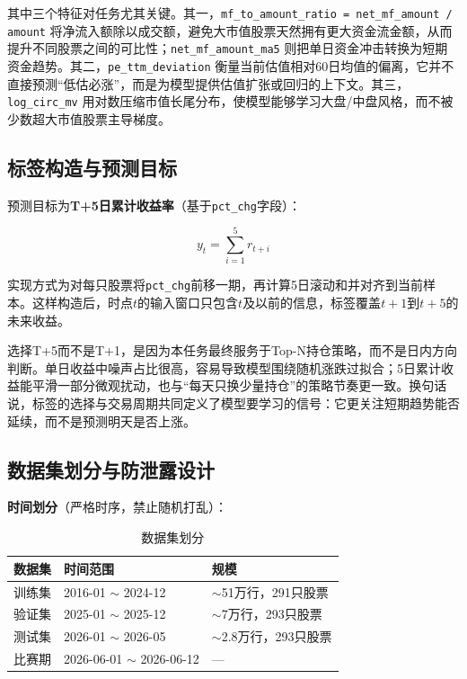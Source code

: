 \documentclass[10pt,a4paper]{ctexart}
\begin{document}
其中三个特征对任务尤其关键。其一，\texttt{mf\_to\_amount\_ratio = net\_mf\_amount / amount} 将净流入额除以成交额，避免大市值股票天然拥有更大资金流金额，从而提升不同股票之间的可比性；\texttt{net\_mf\_amount\_ma5} 则把单日资金冲击转换为短期资金趋势。其二，\texttt{pe\_ttm\_deviation} 衡量当前估值相对60日均值的偏离，它并不直接预测“低估必涨”，而是为模型提供估值扩张或回归的上下文。其三，\texttt{log\_circ\_mv} 用对数压缩市值长尾分布，使模型能够学习大盘/中盘风格，而不被少数超大市值股票主导梯度。

\subsection{标签构造与预测目标}

预测目标为\textbf{T+5日累计收益率}（基于\texttt{pct\_chg}字段）：

\begin{equation}
    y_t = \sum_{i=1}^{5} r_{t+i}
\end{equation}

实现方式为对每只股票将\texttt{pct\_chg}前移一期，再计算5日滚动和并对齐到当前样本。这样构造后，时点$t$的输入窗口只包含$t$及以前的信息，标签覆盖$t+1$到$t+5$的未来收益。

选择T+5而不是T+1，是因为本任务最终服务于Top-N持仓策略，而不是日内方向判断。单日收益中噪声占比很高，容易导致模型围绕随机涨跌过拟合；5日累计收益能平滑一部分微观扰动，也与“每天只换少量持仓”的策略节奏更一致。换句话说，标签的选择与交易周期共同定义了模型要学习的信号：它更关注短期趋势能否延续，而不是预测明天是否上涨。

\subsection{数据集划分与防泄露设计}

\textbf{时间划分}（严格时序，禁止随机打乱）：

\begin{table}[htbp]
    \centering
    \caption{数据集划分}
    \begin{tabular}{lll}
        \toprule
        数据集 & 时间范围 & 规模 \\
        \midrule
        训练集 & 2016-01 $\sim$ 2024-12 & $\sim$51万行，291只股票 \\
        验证集 & 2025-01 $\sim$ 2025-12 & $\sim$7万行，293只股票 \\
        测试集 & 2026-01 $\sim$ 2026-05 & $\sim$2.8万行，293只股票 \\
        比赛期 & 2026-06-01 $\sim$ 2026-06-12 & --- \\
        \bottomrule
    \end{tabular}
\end{table}
\end{document}
